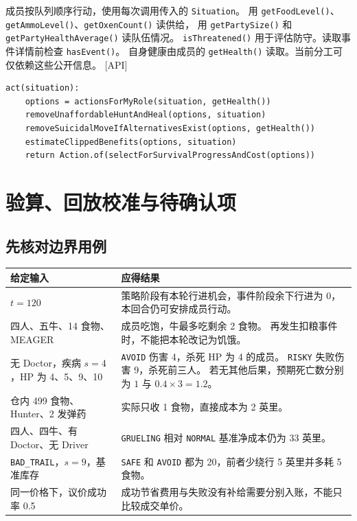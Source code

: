 \documentclass[UTF8,11pt,a4paper]{ctexart}
\newcommand{\src}[1]{\textup{\small\textcolor{muted}{[#1]}}}
\newcommand{\api}[1]{\texttt{#1}}
\begin{document}
{\RaggedRight
成员按队列顺序行动，使用每次调用传入的 \api{Situation}。
用 \api{getFoodLevel()}、\api{getAmmoLevel()}、\api{getOxenCount()} 读供给，
用 \api{getPartySize()} 和 \api{getPartyHealthAverage()} 读队伍情况。
\api{isThreatened()} 用于评估防守。读取事件详情前检查 \api{hasEvent()}。
自身健康由成员的 \api{getHealth()} 读取。当前分工可仅依赖这些公开信息。 \src{API}\par}

\begin{lstlisting}
act(situation):
    options = actionsForMyRole(situation, getHealth())
    removeUnaffordableHuntAndHeal(options, situation)
    removeSuicidalMoveIfAlternativesExist(options, getHealth())
    estimateClippedBenefits(options, situation)
    return Action.of(selectForSurvivalProgressAndCost(options))
\end{lstlisting}

\clearpage
\section{验算、回放校准与待确认项}\label{sec:tests}

\subsection{先核对边界用例}

\begin{center}\small
\begin{tabularx}{\linewidth}{@{}L{4.7cm}Y@{}}
\toprule
给定输入 & 应得结果 \\
\midrule
$t=120$ & 策略阶段有本轮行进机会，事件阶段余下行进为 0，
本回合仍可安排成员行动。 \\
四人、五牛、14 食物、MEAGER & 成员吃饱，牛最多吃剩余 2 食物。
再发生扣粮事件时，不能把本轮改记为饥饿。 \\
无 Doctor，疾病 $s=4$，HP 为 4、5、9、10 &
\api{AVOID} 伤害 4，杀死 HP 为 4 的成员。
\api{RISKY} 失败伤害 9，杀死前三人。
若无其他后果，预期死亡数分别为 $1$ 与 $0.4\times3=1.2$。 \\
仓内 499 食物、Hunter、2 发弹药 &
实际只收 1 食物，直接成本为 2 英里。 \\
四人、四牛、有 Doctor、无 Driver &
\api{GRUELING} 相对 \api{NORMAL} 基准净成本仍为 33 英里。 \\
\api{BAD\_TRAIL}，$s=9$，基准库存 &
\api{SAFE} 和 \api{AVOID} 都为 20，前者少绕行 5 英里并多耗 5 食物。 \\
同一价格下，议价成功率 0.5 &
成功节省费用与失败没有补给需要分别入账，不能只比较成交单价。 \\
\bottomrule
\end{tabularx}
\end{center}
\end{document}
